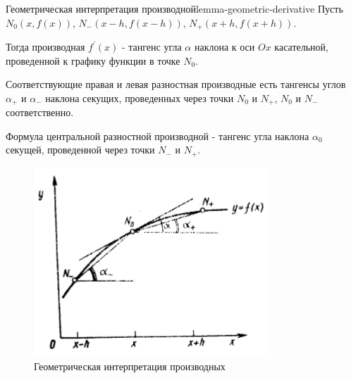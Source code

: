 \documentclass[14pt]{extarticle}
\begin{document}
    \begin{lemma}{Геометрическая интерпретация производной}{lemma-geometric-derivative}
        Пусть $N_{0}(x, f(x))$, $N_{-}(x - h, f(x - h))$, $N_{+}(x + h, f(x + h))$. 
        
        \vspace{\baselineskip}

        Тогда производная $f^{'}(x)$ - тангенс угла $\alpha$ наклона к оси $Ox$ касательной, проведенной к графику функции в точке $N_{0}$.
        
        \vspace{\baselineskip}
        
        Соответствующие правая и левая разностная производные есть тангенсы углов $\alpha_{+}$ и $\alpha_{-}$ наклона секущих, проведенных через точки $N_{0}$ и $N_{+}$, $N_{0}$ и $N_{-}$ соответственно.

        \vspace{\baselineskip}

        Формула центральной разностной производной - тангенс угла наклона $\alpha_{0}$ секущей, проведенной через точки $N_{-}$ и $N_{+}$. 

        \begin{figure}[H]
            \centering
            \includegraphics[scale=0.7]{images/geometric-derivative-ex-1.png}
            \caption{Геометрическая интерпретация производных}
            \label{fig:derivative-interpretation-1}
        \end{figure}


\end{lemma}
\end{document}
